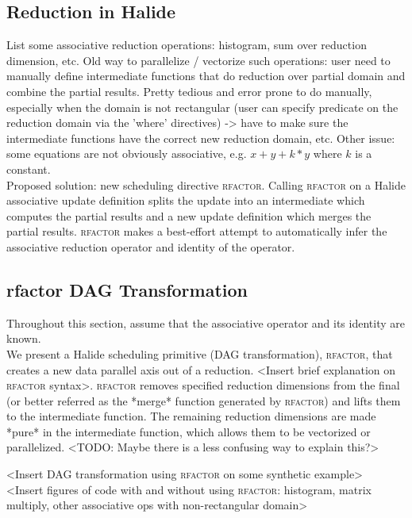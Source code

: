 \subsection{Reduction in Halide}

List some associative reduction operations: histogram, sum over reduction dimension, etc. Old way to parallelize / vectorize such operations: user need to manually define intermediate functions that do reduction over partial domain and combine the partial results. Pretty tedious and error prone to do manually, especially when the domain is not rectangular (user can specify predicate on the reduction domain via the 'where' directives) -> have to make sure the intermediate functions have the correct new reduction domain, etc. Other issue: some equations are not obviously associative, e.g. $x + y + k*y$ where $k$ is a constant. \\

Proposed solution: new scheduling directive \textsc{rfactor}. Calling \textsc{rfactor} on a Halide associative update definition splits the update into an intermediate which computes the partial results and a new update definition which merges the partial results. \textsc{rfactor} makes a best-effort attempt to automatically infer the associative reduction operator and identity of the operator.

\subsection{rfactor DAG Transformation}

Throughout this section, assume that the associative operator and its identity are known. \\

We present a Halide scheduling primitive (DAG transformation), \textsc{rfactor}, that creates a new data parallel axis out of a reduction. <Insert brief explanation on \textsc{rfactor} syntax>. \textsc{rfactor} removes specified reduction dimensions from the final (or better referred as the *merge* function generated by \textsc{rfactor}) and lifts them to the intermediate function. The remaining reduction dimensions are made *pure* in the intermediate function, which allows them to be vectorized or parallelized. <TODO: Maybe there is a less confusing way to explain this?>

<Insert DAG transformation using \textsc{rfactor} on some synthetic example> \\

<Insert figures of code with and without using \textsc{rfactor}: histogram, matrix multiply, other associative ops with non-rectangular domain> \\

